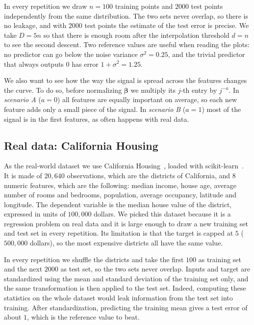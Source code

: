 \documentclass[11pt,a4paper]{article}
\begin{document}
In every repetition we draw $n = 100$ training points and $2000$ test points
independently from the same distribution. The two sets never overlap, so
there is no leakage, and with $2000$ test points the estimate of the test
error is precise. We take $D = 5n$ so that there is enough room after the
interpolation threshold $d = n$ to see the second descent. Two reference
values are useful when reading the plots: no predictor can go below the
noise variance $\sigma^2 = 0.25$, and the trivial predictor that always
outputs $0$ has error $1 + \sigma^2 = 1.25$.

We also want to see how the way the signal is spread across the features
changes the curve. To do so, before normalizing $\boldsymbol{\beta}$ we
multiply its $j$-th entry by $j^{-a}$. In \emph{scenario A} ($a = 0$) all
features are equally important on average, so each new feature adds only a
small piece of the signal. In \emph{scenario B} ($a = 1$) most of the signal
is in the first features, as often happens with real data.

\subsection{Real data: California Housing}
As the real-world dataset we use California Housing~\cite{pace1997sparse},
loaded with scikit-learn~\cite{pedregosa2011scikit}.
It is made of $20{,}640$ observations, which are the districts of California,
and $8$ numeric features, which are the following: median income,
house age, average number of rooms and bedrooms, population, average
occupancy, latitude and longitude. The dependent variable is the median 
house value of the district, expressed in units of $100{,}000$ dollars.
We picked this dataset because it is a regression problem on real data and
it is large enough to draw a new training set and test set in every
repetition. Its limitation is that the target is capped at $5$
($500{,}000$ dollars), so the most expensive districts all have the same
value.

In every repetition we shuffle the districts and take the first $100$ as
training set and the next $2000$ as test set, so the two sets never overlap.
Inputs and target are standardized using the mean and standard deviation of
the training set only, and the same transformation is then applied to the
test set. Indeed, computing these statistics on the whole dataset would leak
information from the test set into training. After standardization,
predicting the training mean gives a test error of about $1$, which is the
reference value to beat.
\end{document}
